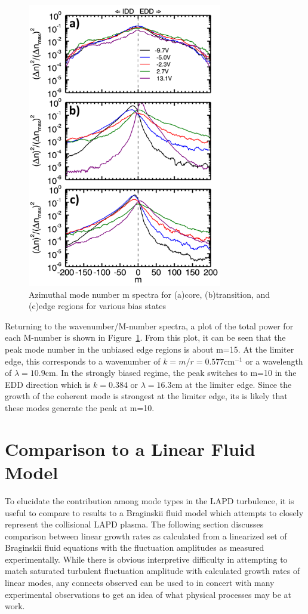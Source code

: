 \documentclass[aip,pop,amsmath,amssymb,reprint,superscriptaddress]{revtex4-1} %
\begin{document}
\begin{figure}[!htbp]
\centerline{
\includegraphics[width=8.5cm]{m_spec_regions_lab}}%
\caption{\label{fig:m_spec_regions} Azimuthal mode number m spectra for (a)core, (b)transition, and (c)edge regions for various bias states}
\end{figure}

Returning to the wavenumber/M-number spectra, a plot of the total power for each M-number is shown in Figure~\ref{fig:m_spec_regions}.  From this plot, it can be seen that the peak mode number in the unbiased edge regions is about m=15. At the limiter edge, this corresponds to a wavenumber of $k = m/r = 0.577 \text{cm}^{-1}$ or a wavelength of $\lambda = 10.9$cm. In the strongly biased regime, the peak switches to m=10 in the EDD direction which is $k = 0.384$ or $\lambda = 16.3$cm at the limiter edge. Since the growth of the coherent mode is strongest at the limiter edge, its is likely that these modes generate the peak at m=10.

\section{Comparison to a Linear Fluid Model}

To elucidate the contribution among mode types in the LAPD turbulence, it is useful to compare to results to a Braginskii fluid model which attempts to closely represent the collisional LAPD plasma. The following section discusses comparison between linear growth rates as calculated from a linearized set of Braginskii fluid equations with the fluctuation amplitudes as measured experimentally. While there is obvious interpretive difficulty in attempting to match saturated turbulent fluctuation amplitude with calculated growth rates of linear modes, any connects observed can be used to in concert with many experimental observations to get an idea of what physical processes may be at work. 
\end{document}

